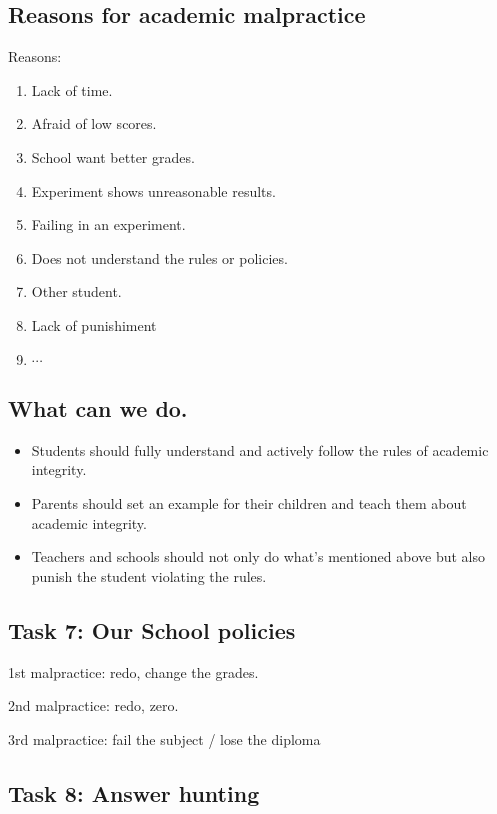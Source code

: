 \documentclass[a4paper]{article}
\begin{document}
\subsection{Reasons for academic malpractice}

Reasons: 

\begin{enumerate}
    \item Lack of time.
    \item Afraid of low scores.
    \item School want better grades.
    \item Experiment shows unreasonable results.
    \item Failing in an experiment.
    \item Does not understand the rules or policies.
    \item Other student.
    \item Lack of punishiment
    \item $\cdots$
\end{enumerate}

\subsection{What can we do.}

\begin{itemize}
    \item Students should fully understand and actively follow the rules of academic integrity.
    \item Parents should set an example for their children and teach them about academic integrity.
    \item Teachers and schools should not only do what's mentioned above but also punish the student violating the rules.
\end{itemize}

\subsection{Task 7: Our School policies}

1st malpractice: redo, change the grades.

2nd malpractice: redo, zero.

3rd malpractice: fail the subject / lose the diploma

\subsection{Task 8: Answer hunting}
\end{document}
